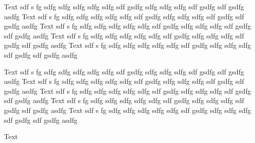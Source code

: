 \documentclass[a4paper]{article}
\begin{document}
Text sdf s fg sdfg sdfg sdfg sdfg sdfg sdf gsdfg sdfg sdfg sdfg sdf gsdfg sdf gsdfg asdfg
Text sdf s fg sdfg sdfg sdfg sdfg sdfg sdf gsdfg sdfg sdfg sdfg sdf gsdfg sdf gsdfg asdfg
Text sdf s fg sdfg sdfg sdfg sdfg sdfg sdf gsdfg sdfg sdfg sdfg sdf gsdfg sdf gsdfg asdfg
Text sdf s fg sdfg sdfg sdfg sdfg sdfg sdf gsdfg sdfg sdfg sdfg sdf gsdfg sdf gsdfg asdfg
Text sdf s fg sdfg sdfg sdfg sdfg sdfg sdf gsdfg sdfg sdfg sdfg sdf gsdfg sdf gsdfg asdfg




Text sdf s fg sdfg sdfg sdfg sdfg sdfg sdf gsdfg sdfg sdfg sdfg sdf gsdfg sdf gsdfg asdfg
Text sdf s fg sdfg sdfg sdfg sdfg sdfg sdf gsdfg sdfg sdfg sdfg sdf gsdfg sdf gsdfg asdfg
Text sdf s fg sdfg sdfg sdfg sdfg sdfg sdf gsdfg sdfg sdfg sdfg sdf gsdfg sdf gsdfg asdfg
Text sdf s fg sdfg sdfg sdfg sdfg sdfg sdf gsdfg sdfg sdfg sdfg sdf gsdfg sdf gsdfg asdfg
Text sdf s fg sdfg sdfg sdfg sdfg sdfg sdf gsdfg sdfg sdfg sdfg sdf gsdfg sdf gsdfg asdfg

Text
\end{document}

